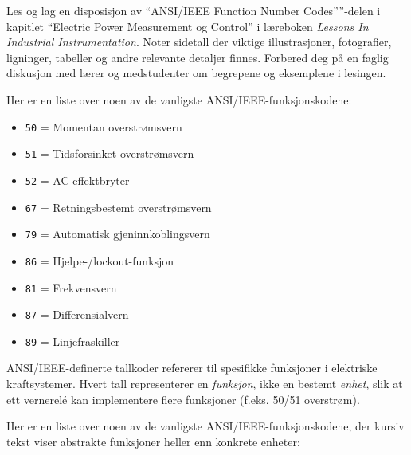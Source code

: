 

Les og lag en disposisjon av ``ANSI/IEEE Function Number Codes''''-delen i kapitlet ``Electric Power Measurement og Control'' i læreboken {\it Lessons In Industrial Instrumentation}. Noter sidetall der viktige illustrasjoner, fotografier, ligninger, tabeller og andre relevante detaljer finnes. Forbered deg på en faglig diskusjon med lærer og medstudenter om begrepene og eksemplene i lesingen.






Her er en liste over noen av de vanligste ANSI/IEEE-funksjonskodene:

\begin{itemize}
\item{} {\tt 50} = Momentan overstrømsvern
\item{} {\tt 51} = Tidsforsinket overstrømsvern
\item{} {\tt 52} = AC-effektbryter
\item{} {\tt 67} = Retningsbestemt overstrømsvern
\item{} {\tt 79} = Automatisk gjeninnkoblingsvern
\item{} {\tt 86} = Hjelpe-/lockout-funksjon
\item{} {\tt 81} = Frekvensvern
\item{} {\tt 87} = Differensialvern
\item{} {\tt 89} = Linjefraskiller
\end{itemize}







ANSI/IEEE-definerte tallkoder refererer til spesifikke funksjoner i elektriske kraftsystemer. Hvert tall representerer en {\it funksjon}, ikke en bestemt {\it enhet}, slik at ett vernerelé kan implementere flere funksjoner (f.eks. 50/51 overstrøm).

\vskip 10pt

Her er en liste over noen av de vanligste ANSI/IEEE-funksjonskodene, der kursiv tekst viser abstrakte funksjoner heller enn konkrete enheter:

